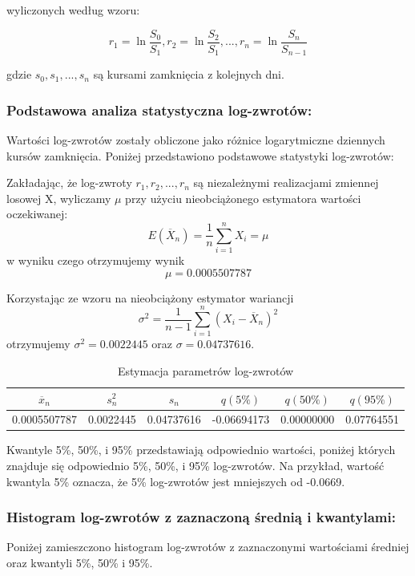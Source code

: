 \documentclass[a4paper,11pt]{article}
\begin{document}
wyliczonych według wzoru:

$$ r_1 = \ln\frac{S_0}{S_1}, r_2 = \ln\frac{S_2}{S_1}, ..., r_n = \ln\frac{S_n}{S_{n-1}} $$

gdzie $s_0, s_1, ..., s_n$ są kursami zamknięcia z kolejnych dni.

\subsubsection{Podstawowa analiza statystyczna log-zwrotów:}

Wartości log-zwrotów zostały obliczone jako różnice logarytmiczne dziennych kursów zamknięcia. Poniżej przedstawiono podstawowe statystyki log-zwrotów:

Zakładając, że log-zwroty $r_1, r_2, ..., r_n$ są niezależnymi realizacjami zmiennej losowej X, wyliczamy $\mu$ przy użyciu nieobciążonego estymatora wartości oczekiwanej:
$$ E(\overline{X}_n) = \frac{1}{n}\sum_{i=1}^{n}X_i = \mu $$
w wyniku czego otrzymujemy wynik 
$$\mu = 0.0005507787$$

Korzystając ze wzoru na nieobciążony estymator wariancji
$$\sigma^{2}=\frac{1}{n-1}\sum_{i=1}^{n}(X_i - \overline{X}_n)^{2}$$
otrzymujemy $\sigma^{2}=0.0022445$ oraz $\sigma=0.04737616$.

\begin{table}[h!]
\centering
\caption{Estymacja parametrów log-zwrotów}
\begin{tabular}{|c|c|c|c|c|c|}
\hline
$\overline{x}_n$ & $s^2_n$ & $s_n$ & $q(5\%)$ & $q(50\%)$ & $q(95\%)$ \\ \hline
0.0005507787 & 0.0022445 & 0.04737616 & -0.06694173 & 0.00000000 & 0.07764551 \\ \hline
\end{tabular}
\end{table}

Kwantyle 5\%, 50\%, i 95\% przedstawiają odpowiednio wartości, poniżej których znajduje się odpowiednio 5\%, 50\%, i 95\% log-zwrotów. Na przykład, wartość kwantyla 5\% oznacza, że 5\% log-zwrotów jest mniejszych od -0.0669.

\subsubsection{Histogram log-zwrotów z zaznaczoną średnią i kwantylami:}

Poniżej zamieszczono histogram log-zwrotów z zaznaczonymi wartościami średniej oraz kwantyli 5\%, 50\% i 95\%.
\end{document}
